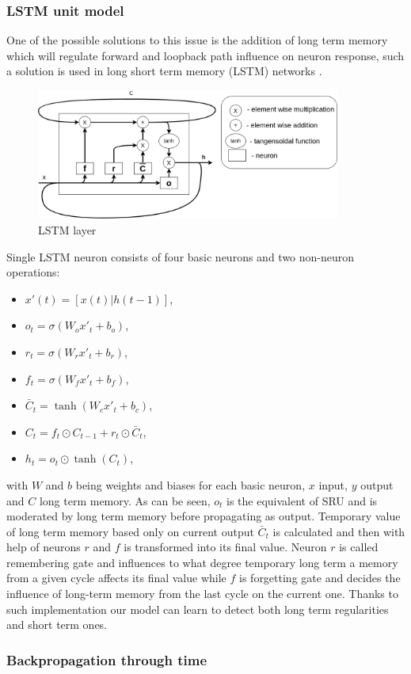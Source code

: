 \subsubsection{LSTM unit model}
One of the possible solutions to this issue is the addition of long term memory which will regulate
forward and loopback path influence on neuron response, such a solution is used in long short
term memory (LSTM) networks \cite{Hochreiter1997}.
\begin{figure}[h] 
	\centering
	\includegraphics[width=10cm]{res/lstm}
	\caption{LSTM layer}
	\label{fig:lstm}
\end{figure}
Single LSTM neuron consists of four basic neurons and two non-neuron operations:
\begin{itemize}
	\item $x'(t)=[x(t)|h(t-1)]$,
	\item $o_t=\sigma (W_o x'_t+b_o)$,
	\item $r_t=\sigma (W_r x'_t+b_r)$,
	\item $f_t=\sigma (W_f x'_t+b_f)$,
	\item $\bar{C}_t=\tanh (W_c x'_t+b_c)$,
	\item $C_t=f_t\odot C_{t-1}+r_t\odot \bar{C}_t$,
	\item $h_t=o_t\odot \tanh (C_t)$,
\end{itemize}
with $W$ and $b$ being weights and biases for each basic neuron, $x$ input, $y$ output and
$C$ long term memory. As can be seen, $o_t$ is the equivalent of SRU and is moderated by
long term memory before propagating as output. Temporary value of long term memory based
only on current output $\bar{C}_t$ is calculated and then with help of neurons $r$ and $f$
is transformed into its final value.
Neuron $r$ is called remembering gate and influences to what degree temporary long term
a memory from a given cycle affects its final value while $f$ is forgetting gate and
decides the influence of long-term memory from the last cycle on the current one.
Thanks to such implementation our model can learn to detect both long term regularities and 
short term ones.

\subsubsection{Backpropagation through time}

